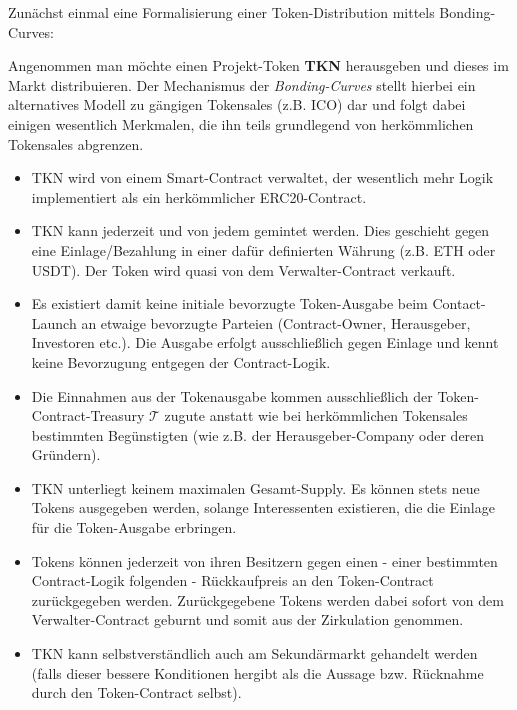 
Zunächst einmal eine Formalisierung einer Token-Distribution mittels Bonding-Curves:

\vspace{0.2cm}

\begin{Def}
\label{defBC}

Angenommen man möchte einen Projekt-Token \textbf{TKN} herausgeben und dieses im Markt distribuieren. Der Mechanismus der \textit{Bonding-Curves} stellt hierbei ein alternatives Modell zu gängigen Tokensales (z.B. ICO) dar und folgt dabei einigen wesentlich Merkmalen, die ihn teils grundlegend von herkömmlichen Tokensales abgrenzen.

\begin{itemize}
  \item TKN wird von einem Smart-Contract verwaltet, der wesentlich mehr Logik implementiert als ein herkömmlicher ERC20-Contract.
  \item TKN kann jederzeit und von jedem gemintet werden. Dies geschieht gegen eine Einlage/Bezahlung in einer dafür definierten Währung (z.B. ETH oder USDT). Der Token wird quasi von dem Verwalter-Contract verkauft.
  \item Es existiert damit keine initiale bevorzugte Token-Ausgabe beim Contact-Launch an etwaige bevorzugte Parteien (Contract-Owner, Herausgeber, Investoren etc.). Die Ausgabe erfolgt ausschließlich gegen Einlage und kennt keine Bevorzugung entgegen der Contract-Logik. 
  \item Die Einnahmen aus der Tokenausgabe kommen ausschließlich der Token-Cont\-ract-Treasury $\mathbf{\mathcal{T}}$ zugute anstatt wie bei herkömmlichen Tokensales bestimmten Begünstigten (wie z.B. der Herausgeber-Company oder deren Gründern).
  \item TKN unterliegt keinem maximalen Gesamt-Supply. Es können stets neue Tokens ausgegeben werden, solange Interessenten existieren, die die Einlage für die Token-Ausgabe erbringen.
  \item Tokens können jederzeit von ihren Besitzern gegen einen - einer bestimmten Contract-Logik folgenden - Rückkaufpreis an den Token-Contract zurückgegeben werden. Zurückgegebene Tokens werden dabei sofort von dem Verwalter-Contract geburnt und somit aus der Zirkulation genommen.
  \item TKN kann selbstverständlich auch am Sekundärmarkt gehandelt werden (falls dieser bessere Konditionen hergibt als die Aussage bzw. Rücknahme durch den Token-Contract selbst).
\end{itemize}


\end{Def}
